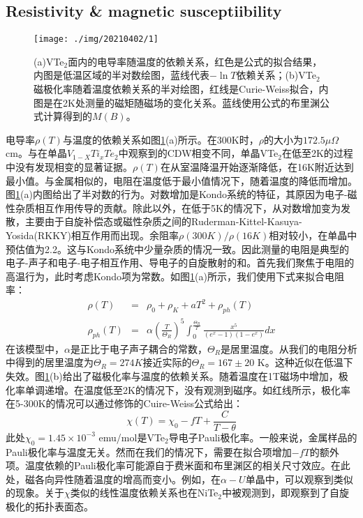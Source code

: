 \documentclass[reprint, aps, prb, showkeys]{revtex4-2}
\begin{document}
\subsection{Resistivity \& magnetic susceptiibility}
\begin{figure}[b]
    \texttt{[image: ./img/20210402/1]}
    \caption{\label{fig:Resistivity} 
    (a)VTe$_2$面内的电导率随温度的依赖关系，红色是公式的拟合结果，内图是低温区域的半对数绘图，蓝线代表$- \ln T$依赖关系；(b)VTe$_2$磁极化率随着温度依赖关系的半对绘图，红线是Curie-Weiss拟合，内图是在2K处测量的磁矩随磁场的变化关系。蓝线使用公式的布里渊公式计算得到的$M(B)$。
    }
\end{figure}
电导率$\rho(T)$与温度的依赖关系如图\ref{fig:Resistivity}(a)所示。在300K时，$\rho$的大小为$172.5 \mu\Omega$ cm。与在单晶$V_{1-X}Ti_xTe_2$中观察到的CDW相变不同，单晶VTe$_2$在低至2K的过程中没有发现相变的显著证据。$\rho(T)$在从室温降温开始逐渐降低，在16K附近达到最小值。与金属相似的，电阻在温度低于最小值情况下，随着温度的降低而增加。图\ref{fig:Resistivity}(a)内图给出了半对数的行为。对数增加是Kondo系统的特征，其原因为电子-磁性杂质相互作用传导的贡献。除此以外，在低于5K的情况下，从对数增加变为发散，主要由于自旋补偿态或磁性杂质之间的Ruderman-Kittel-Kasuya-Yosida(RKKY)相互作用而出现。余阻率$\rho(300K)/\rho(16K)$相对较小，在单晶中预估值为2.2。这与Kondo系统中少量杂质的情况一致。因此测量的电阻是典型的电子-声子和电子-电子相互作用、导电子的自旋散射的和。首先我们聚焦于电阻的高温行为，此时考虑Kondo项为常数。如图\ref{fig:Resistivity}(a)所示，我们使用下式来拟合电阻率：
\begin{eqnarray}
    \rho(T) &=& \rho_0 + \rho_K + aT^2 + \rho_{ph}(T)\label{rho} \\
    \rho_{ph}(T) &=& \alpha \left( \frac{T}{\Theta_R} \right)^5 \int_0^{\frac{\Theta_R}{T}} \frac{x^5}{(e^x - 1)(1 - e^x)} dx\label{rhoph}
\end{eqnarray}
在该模型中，$\alpha$是正比于电子声子耦合的常数，$\Theta_R$是居里温度。从我们的电阻分析中得到的居里温度为$\Theta_R = 274 K$接近实际的$\Theta_R = 167 \pm 20$ K。这种近似在低温下失效。图\ref{fig:Resistivity}(b)给出了磁极化率与温度的依赖关系。随着温度在1T磁场中增加，极化率单调递增。在温度低至2K的情况下，没有观测到磁序。如红线所示，极化率在5-300K的情况可以通过修饰的Cuire-Weiss公式给出：
\begin{equation}
    \chi(T) = \chi_0 - fT + \frac{C}{T - \theta} \label{Cuire-Weiss}
\end{equation}
此处$\chi_0 = 1.45 \times 10^{-3}$ emu/mol是VTe$_2$导电子Pauli极化率。一般来说，金属样品的Pauli极化率与温度无关。然而在我们的情况下，需要在拟合项增加$-fT$的额外项。温度依赖的Pauli极化率可能源自于费米面和布里渊区的相关尺寸效应。在此处，磁各向异性随着温度的增高而变小。例如，在$\alpha-U$单晶中，可以观察到类似的现象。关于$\chi$类似的线性温度依赖关系也在NiTe$_2$中被观测到，即观察到了自旋极化的拓扑表面态。
\end{document}
